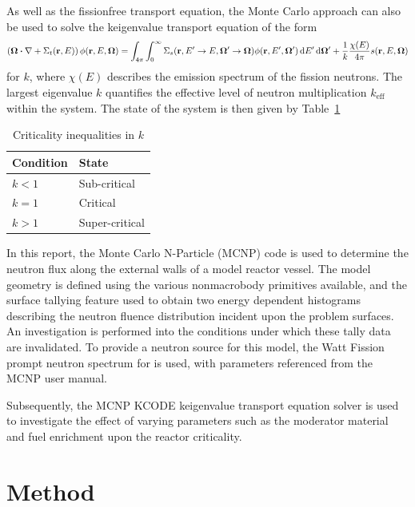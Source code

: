 \documentclass{article}
\begin{document}
As well as the fission\textendash free transport equation, the Monte Carlo approach can also be used to solve the k\textendash eigenvalue transport equation of the form
\begin{equation}
  \label{eq:k_eigenvalue_transport}
  \left(\vb{\Omega}\dotproduct\vb{\nabla}+\Sigma_t(\vb{r},E)\right)\phi(\vb{r},E,\vb{\Omega})=\int_{4\pi}{\int_0^\infty{\Sigma_s(\vb{r},E^\prime\rightarrow E,\vb{\Omega^\prime}\rightarrow\vb{\Omega})\phi(\vb{r},E^\prime,\vb{\Omega^\prime})\dd{E^\prime}}\dd{\vb{\Omega^\prime}}}+\frac{1}{k}\frac{\chi(E)}{4\pi}s(\vb{r},E,\vb{\Omega})
\end{equation}
for $k$, where $\chi(E)$ describes the emission spectrum of the fission neutrons. The largest eigenvalue $k$ quantifies the effective level of neutron multiplication $k_{\text{eff}}$ within the system. The state of the system is then given by Table~\ref{table:k}
\begin{table}[]
\centering
\caption{Criticality inequalities in $k$}
\label{table:k}
\begin{tabular}{@{}ll@{}}
\toprule
Condition & State          \\ \midrule
$k < 1$   & Sub-critical   \\
$k = 1$   & Critical       \\
$k > 1$   & Super-critical \\ \bottomrule
\end{tabular}
\end{table}

In this report, the Monte Carlo N-Particle (MCNP) code is used to determine the neutron flux along the external walls of a model reactor vessel. The model geometry is defined using the various non\textendash macrobody primitives available, and the surface tallying feature used to obtain two energy dependent histograms describing the neutron fluence distribution incident upon the problem surfaces. An investigation is performed into the conditions under which these tally data are invalidated. To provide a neutron source for this model, the Watt Fission prompt neutron spectrum for  is used, with parameters referenced from the MCNP user manual.

Subsequently, the MCNP KCODE k\textendash eigenvalue transport equation solver is used to investigate the effect of varying parameters such as the moderator material and fuel enrichment upon the reactor criticality.

\section{Method}
\end{document}
